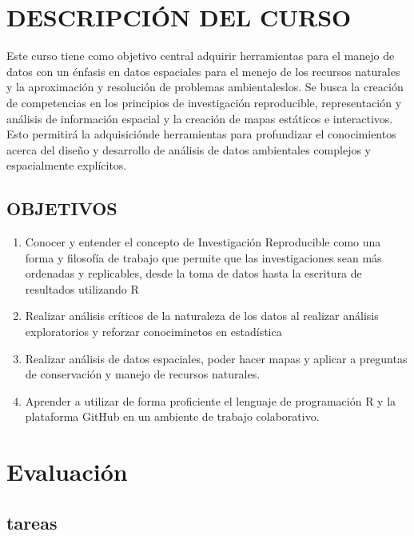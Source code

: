 \documentclass[
]{book}
\begin{document}
\hypertarget{descripciuxf3n-del-curso}{%
\section{DESCRIPCIÓN DEL CURSO}\label{descripciuxf3n-del-curso}}

Este curso tiene como objetivo central adquirir herramientas para el manejo de datos con un énfasis en datos espaciales para el menejo de los recursos naturales y la aproximación y resolución de problemas ambientaleslos. Se busca la creación de competencias en los principios de investigación reproducible, representación y análisis de información espacial y la creación de mapas estáticos e interactivos. Esto permitirá la adquisiciónde herramientas para profundizar el conocimientos acerca del diseño y desarrollo de análisis de datos ambientales complejos y espacialmente explícitos.

\hypertarget{objetivos}{%
\subsection{OBJETIVOS}\label{objetivos}}

\begin{enumerate}
\def\labelenumi{\arabic{enumi}.}
\item
  Conocer y entender el concepto de Investigación Reproducible como una forma y filosofía de trabajo que permite que las investigaciones sean más ordenadas y replicables, desde la toma de datos hasta la escritura de resultados utilizando R
\item
  Realizar análisis críticos de la naturaleza de los datos al realizar análisis exploratorios y reforzar conociminetos en estadística
\item
  Realizar análisis de datos espaciales, poder hacer mapas y aplicar a preguntas de conservación y manejo de recursos naturales.
\item
  Aprender a utilizar de forma proficiente el lenguaje de programación R y la plataforma GitHub en un ambiente de trabajo colaborativo.
\end{enumerate}

\hypertarget{evaluaciuxf3n}{%
\section{Evaluación}\label{evaluaciuxf3n}}

\hypertarget{tareas}{%
\subsection{tareas}\label{tareas}}
\end{document}
